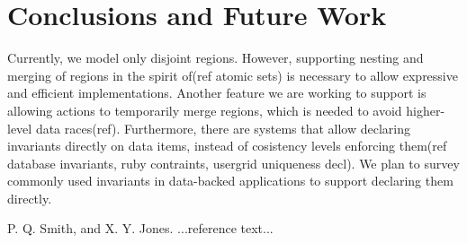 \documentclass[preprint, numbers]{sigplanconf}
\begin{document}
\section{Conclusions and Future Work}
Currently, we model only disjoint regions. However, supporting
nesting and merging of regions in the spirit of(ref atomic sets) is necessary to allow expressive and efficient
implementations. Another feature we are working to support is allowing actions to temporarily merge regions, which
is needed to avoid higher-level data races(ref). Furthermore, there are systems
that allow declaring invariants directly on data items, instead of 
cosistency levels enforcing them(ref database invariants, ruby contraints,
usergrid uniqueness decl). We plan to survey commonly used
invariants in data-backed applications to support declaring them directly.







\begin{thebibliography}{}
\softraggedright

P. Q. Smith, and X. Y. Jones. ...reference text...

\end{thebibliography}
\end{document}
